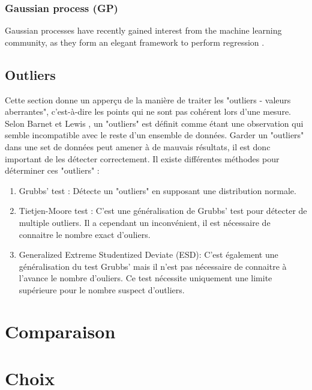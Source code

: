 \subsubsection{Gaussian process (GP)}
Gaussian processes have recently gained interest from the machine learning community, as they form an elegant framework to perform regression \cite{ML51}.

\subsection{Outliers \cite{ML_indoor}}
Cette section donne un apperçu de la manière de traiter les "outliers - valeurs aberrantes", c'est-à-dire les points qui ne sont pas cohérent lors d'une mesure. Selon Barnet et Lewis \cite{Outliers}, un "outliers" est définit comme étant une observation qui semble incompatible avec le reste d'un ensemble de données.
Garder un "outliers" dans une set de données peut amener à de mauvais résultats, il est donc important de les détecter correctement. Il existe différentes méthodes pour déterminer ces "outliers" :

\begin{enumerate}
	\item Grubbs' test : Détecte un "outliers" en supposant une distribution normale.
	\item Tietjen-Moore test : C'est une généralisation de Grubbs' test pour détecter de multiple outliers. Il a cependant un inconvénient, il est nécessaire de connaitre le nombre exact d'ouliers.
	\item Generalized Extreme Studentized Deviate (ESD): C'est également une généralisation du test Grubbs' mais il n'est pas nécessaire de connaitre à l'avance le nombre d'ouliers. Ce test nécessite uniquement une limite supérieure pour le nombre suspect d'outliers.\cite{ESD}
\end{enumerate}

\section{Comparaison}

\section{Choix}




